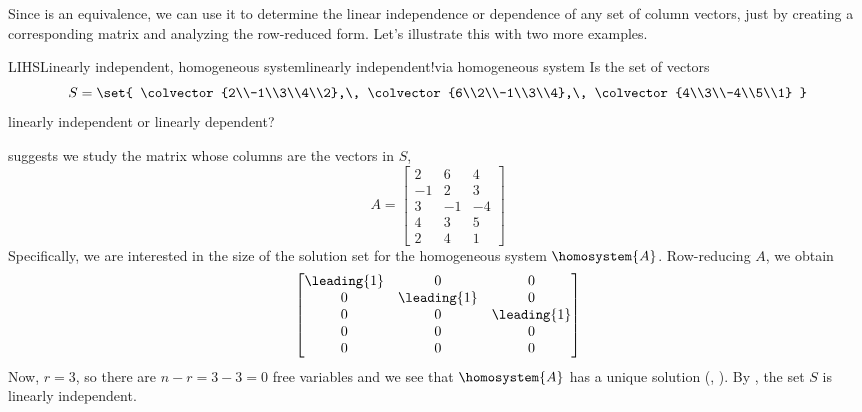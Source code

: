 %
Since  is an equivalence, we can use it to determine the linear independence or dependence of any set of column vectors, just by creating a corresponding matrix and analyzing the row-reduced form.  Let's illustrate this with two more examples.
%
\begin{example}{LIHS}{Linearly independent, homogeneous system}{linearly independent!via homogeneous system}
Is the set of vectors
%
\begin{equation*}
S=\set{
\colvector{2\\-1\\3\\4\\2},\,
\colvector{6\\2\\-1\\3\\4},\,
\colvector{4\\3\\-4\\5\\1}
}
\end{equation*}
%
linearly independent or linearly dependent?\par
%
 suggests we study the matrix whose columns are the vectors in $S$,
%
\begin{equation*}
A=
\begin{bmatrix}
2 & 6 & 4\\
-1 & 2 & 3\\
3 & -1 & -4\\
4 & 3 & 5\\
2 & 4 & 1
\end{bmatrix}
\end{equation*}
%
Specifically, we are interested in the size of the solution set for the homogeneous system $\homosystem{A}$.  Row-reducing $A$, we obtain
%
\begin{equation*}
\begin{bmatrix}
\leading{1} & 0 & 0\\
0 & \leading{1} & 0\\
0 & 0 & \leading{1}\\
0 & 0 & 0\\
0 & 0 & 0
\end{bmatrix}
\end{equation*}
%
Now, $r=3$, so there are $n-r=3-3=0$ free variables and we see that $\homosystem{A}$ has a unique solution  (, ).  By , the set $S$ is linearly independent.
%
\end{example}
